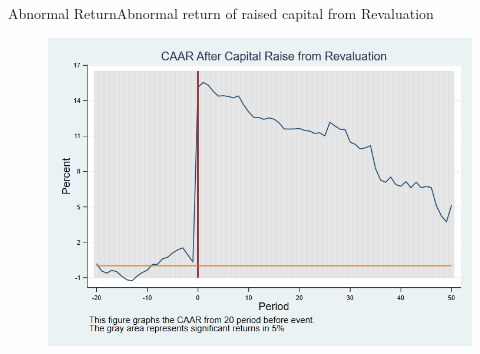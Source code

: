 \documentclass{beamer}
\begin{document}
	
	
	
	
	
	\begin{frame}{Abnormal Return}{Abnormal return of raised capital from Revaluation}
		\label{abreturnrevalution}
		\begin{figure}
			\centering
			\includegraphics[width=0.65\linewidth]{Output/CARRevaluation.png}
			\label{fig:abreturnrevalution}
		\end{figure}

	\end{frame}
	
\end{document}
